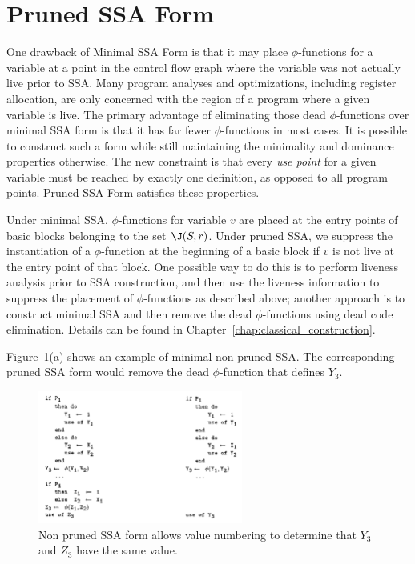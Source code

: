 \section{Pruned SSA Form}
\label{sec-prop-pruned}

One drawback of Minimal SSA Form is that it may place $\phi$-functions
for a variable at a point in the control flow graph where the variable was
not actually live prior to SSA. Many program analyses and optimizations,
including register allocation, are only concerned with the region of a 
program where a given variable is live. 
The primary advantage of eliminating those dead $\phi$-functions over minimal SSA form
is that it has far fewer $\phi$-functions in most cases.  
It is possible to construct such a form while still maintaining the minimality
and dominance properties otherwise. The new constraint is that every
\emph{use point} for a given variable must be reached by exactly one
definition, as opposed to all program points. Pruned SSA Form satisfies these properties. 

Under minimal SSA, $\phi$-functions for variable $v$ are placed at
the entry points of basic blocks belonging to the set $\J(S,r)$. 
Under pruned SSA, we suppress the instantiation of a $\phi$-function
at the beginning of a basic block if $v$ is not live
at the entry point of that block. One possible way to do this is to
perform liveness analysis prior to SSA construction, and then
use the liveness information to suppress the placement of $\phi$-functions
as described above; another approach is to construct minimal SSA
and then remove the dead $\phi$-functions using dead code
elimination. Details can be found in Chapter~\ref{chap:classical_construction}.

Figure~\ref{fig:properties_and_flavors:pruned}(a) shows an example of minimal non pruned SSA.
The corresponding pruned SSA form would remove the dead $\phi$-function that defines $Y_3$.

\begin{figure}
\includegraphics[width=0.6\textwidth]{pruned.pdf}
\caption{\label{fig:properties_and_flavors:pruned}Non pruned SSA form allows value numbering to determine that $Y_3$ and $Z_3$ have the same value.}
\end{figure}



